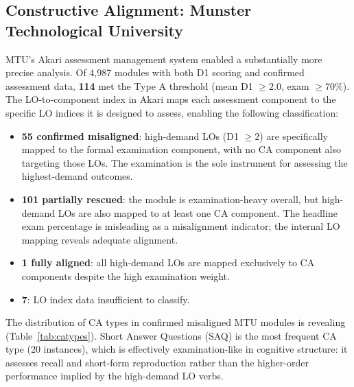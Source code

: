 \documentclass[12pt, a4paper]{article}
\begin{document}
\subsection{Constructive Alignment: Munster Technological University}

MTU's Akari assessment management system enabled a substantially more precise analysis.
Of 4,987 modules with both D1 scoring and confirmed assessment data, \textbf{114}
met the Type A threshold (mean D1 $\geq 2.0$, exam $\geq 70\%$). The LO-to-component
index in Akari maps each assessment component to the specific LO indices it is
designed to assess, enabling the following classification:

\begin{itemize}
  \item \textbf{55 confirmed misaligned}: high-demand LOs (D1 $\geq 2$) are
    specifically mapped to the formal examination component, with no CA component
    also targeting those LOs. The examination is the sole instrument for assessing
    the highest-demand outcomes.

  \item \textbf{101 partially rescued}: the module is examination-heavy overall, but
    high-demand LOs are also mapped to at least one CA component. The headline exam
    percentage is misleading as a misalignment indicator; the internal LO mapping
    reveals adequate alignment.

  \item \textbf{1 fully aligned}: all high-demand LOs are mapped exclusively to CA
    components despite the high examination weight.

  \item \textbf{7}: LO index data insufficient to classify.
\end{itemize}

The distribution of CA types in confirmed misaligned MTU modules is revealing
(Table~\ref{tab:catypes}). Short Answer Questions (SAQ) is the most frequent CA
type (20 instances), which is effectively examination-like in cognitive structure:
it assesses recall and short-form reproduction rather than the higher-order
performance implied by the high-demand LO verbs.
\end{document}
